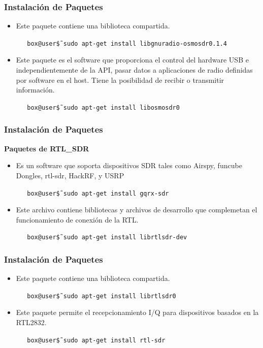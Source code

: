 \begin{frame}
\frametitle{Instalación de Paquetes}

\begin{itemize}
    \item {Este paquete contiene una biblioteca compartida.
    \begin{block}{}
    \texttt
    {\ \ \ box@user\~\$ sudo apt-get install libgnuradio-osmosdr0.1.4}
    \end{block}}
    
    \item{Este paquete es el software que proporciona el control del hardware USB e independientemente de la API, pasar datos a aplicaciones de radio definidas por software en el host. Tiene la posibilidad de recibir o transmitir información.
    \begin{block}{}
    \texttt
    {\ \ \ box@user\~\$ sudo apt-get install libosmosdr0}
    \end{block}}
\end{itemize}

\end{frame}

\begin{frame}
\frametitle{Instalación de Paquetes}
\textbf{Paquetes de RTL\_SDR}
\begin{itemize}
 
    \item { Es un software que soporta dispositivos SDR tales como Airspy, funcube Dongles, rtl-sdr, HackRF, y USRP
    \begin{block}{}
    \texttt
    {\ \ \ box@user\~\$ sudo apt-get install gqrx-sdr}
    \end{block}}
     \item { Este archivo contiene bibliotecas y archivos de desarrollo que complemetan el funcionamiento de conexión de la RTL.
    \begin{block}{}
    \texttt
    {\ \ \ box@user\~\$ sudo apt-get install librtlsdr-dev}
    \end{block}}
\end{itemize}

\end{frame}

\begin{frame}
\frametitle{Instalación de Paquetes}
\begin{itemize}
 
    \item {Este paquete contiene una biblioteca compartida.
    \begin{block}{}
    \texttt
    {\ \ \ box@user\~\$ sudo apt-get install librtlsdr0}
    \end{block}}
    \item {Este paquete permite el recepcionamiento I/Q para dispositivos basados en la RTL2832. 
    \begin{block}{}
    \texttt
    {\ \ \ box@user\~\$ sudo apt-get install rtl-sdr}
    \end{block}}
\end{itemize}

\end{frame}

